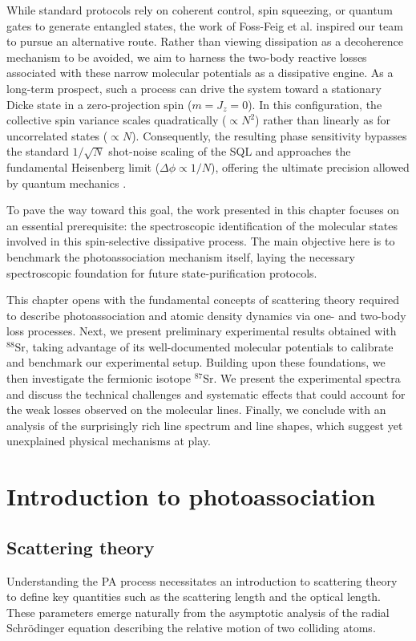 While standard protocols rely on coherent control, spin squeezing, or quantum gates to generate entangled states, the work of Foss-Feig et al. \cite{foss-feig_steady-state_2012} inspired our team to pursue 
an alternative route. Rather than viewing dissipation as a decoherence mechanism to be avoided, we aim to harness the two-body reactive losses associated with these narrow molecular potentials as a dissipative 
engine. As a long-term prospect, such a process can drive the system toward a stationary Dicke state in a zero-projection spin ($m = J_z = 0$). In this configuration, the collective spin variance scales 
quadratically ($\propto N^2$) rather than linearly as for uncorrelated states ($\propto N$). Consequently, the resulting phase sensitivity bypasses the standard $1/\sqrt{N}$ shot-noise scaling of the SQL and 
approaches the fundamental Heisenberg limit ($\Delta\phi \propto 1/N$), offering the ultimate precision allowed by quantum mechanics \cite{pezze_quantum_2014}.

To pave the way toward this goal, the work presented in this chapter focuses on an essential prerequisite: the spectroscopic identification of the molecular states involved in 
this spin-selective dissipative process. The main objective here is to benchmark the photoassociation mechanism itself, laying the necessary spectroscopic foundation for future
state-purification protocols.

This chapter opens with the fundamental concepts of scattering theory required to describe photoassociation and atomic density dynamics via one- and two-body loss processes. 
Next, we present preliminary experimental results obtained with $^{88}\text{Sr}$, taking advantage of its well-documented molecular potentials to calibrate and benchmark our 
experimental setup. Building upon these foundations, we then investigate the fermionic isotope $^{87}\text{Sr}$. We present the experimental spectra and discuss the technical 
challenges and systematic effects that could account for the weak losses observed on the molecular lines. Finally, we conclude with an analysis of the surprisingly rich line 
spectrum and line shapes, which suggest yet unexplained physical mechanisms at play.

\section{Introduction to photoassociation}
\subsection{Scattering theory}
Understanding the PA process necessitates an introduction to scattering theory to define key quantities such as the scattering length and the optical length. These parameters 
emerge naturally from the asymptotic 
analysis of the radial Schrödinger equation describing the relative motion of two colliding atoms.

